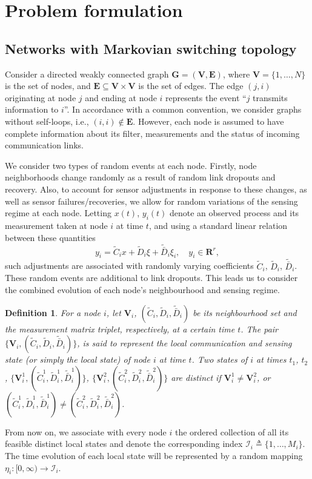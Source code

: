 \documentclass[a4paper,twocolumn]{autart}
\newtheorem{definition}{Definition}
\begin{document}
\section{Problem formulation}\label{Distr.Cons}

\subsection{Networks with Markovian switching topology}\label{networks}

Consider a directed weakly connected
graph $\mathbf{G}=(\mathbf{V},\mathbf{E})$, where $\mathbf{V}=\{1,\ldots,N\}$
is the set of nodes, and $\mathbf{E}\subseteq \mathbf{V}\times
\mathbf{V}$ is the set of edges. The edge $(j,i)$ 
originating at node $j$ and ending at node $i$ represents the event ``$j$
transmits information to $i$''. In accordance with a common convention, we
consider graphs without 
self-loops, i.e., $(i,i)\not\in\mathbf{E}$. However, each node is assumed
to have complete information about its filter, measurements and the
status of incoming communication links. 

We consider two types of random events at each
node. Firstly, node neighborhoods change randomly as a result of random link
dropouts and recovery. Also, to account for sensor adjustments in
response to these changes, as well as sensor failures/recoveries, we 
allow for random variations of the sensing regime at each node. 
Letting $x(t)$, $y_i(t)$ denote an
observed process and its measurement taken at node $i$ at time $t$, and
using a standard linear relation between these quantities
\begin{equation}\label{U6.yi.1.pattern}
y_i=\tilde C_i x+\tilde D_i \xi+{\tilde{\bar
    D}_i}\xi_i, \quad y_i\in\mathbf{R}^r,
\end{equation}
such adjustments are associated with randomly varying coefficients $\tilde C_i$,
$\tilde D_i$, ${\tilde{\bar D}_i}$. These random events are additional
to link dropouts.  This leads us to consider the combined evolution of each
node's neighbourhood and sensing regime.   

\begin{definition}\label{Distinct.N}
For a node $i$, let $\mathbf{V}_i$, $(\tilde C_i,\tilde D_i, \tilde{\bar
  D}_i)$ be its neighbourhood set and the measurement matrix 
triplet, respectively,
at a certain time $t$.  The pair $\{\mathbf{V}_i,(\tilde C_i,\tilde
D_i, \tilde{\bar D}_i)\}$, is said to represent the \emph{local
communication and sensing state} (or simply the \emph{local state}) of node 
$i$ at time $t$. Two states of $i$ at times $t_1$, $t_2$, 
$\{\mathbf{V}_i^1,(\tilde C_i^1,\tilde D_i^1, \tilde{\bar D}^1_i)\}$, 
$\{\mathbf{V}_i^2,(\tilde C_i^2,\tilde D_i^2, \tilde{\bar D}^2_i)\}$
are distinct if\/
$\mathbf{V}_i^1\neq \mathbf{V}_i^2$, or
$(\tilde C_i^1,\tilde D_i^1,
\tilde{\bar D}^1_i)\neq (\tilde C_i^2,\tilde D_i^2, \tilde{\bar
  D}^2_i)$.
\end{definition}
From now on, we associate with every node $i$ the ordered collection of all
its feasible distinct local states and denote the
corresponding index $ \mathcal{I}_i\triangleq \{1,\ldots,M_i\}$.
The time evolution of each local state will be represented by a random mapping
$\eta_i:[0,\infty) \to \mathcal{I}_i$.     
\end{document}
